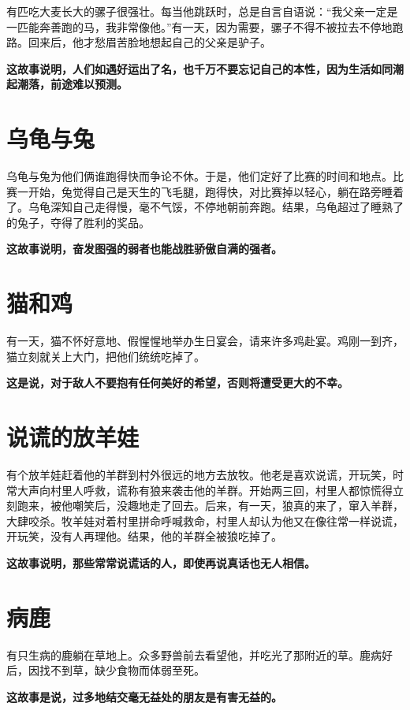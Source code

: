 有匹吃大麦长大的骡子很强壮。每当他跳跃时，总是自言自语说：“我父亲一定是一匹能奔善跑的马，我非常像他。”有一天，因为需要，骡子不得不被拉去不停地跑路。回来后，他才愁眉苦脸地想起自己的父亲是驴子。

{\bfseries \color{red}这故事说明，人们如遇好运出了名，也千万不要忘记自己的本性，因为生活如同潮起潮落，前途难以预测。}

\section{乌龟与兔}

乌龟与兔为他们俩谁跑得快而争论不休。于是，他们定好了比赛的时间和地点。比赛一开始，兔觉得自己是天生的飞毛腿，跑得快，对比赛掉以轻心，躺在路旁睡着了。乌龟深知自己走得慢，毫不气馁，不停地朝前奔跑。结果，乌龟超过了睡熟了的兔子，夺得了胜利的奖品。

{\bfseries \color{red}这故事说明，奋发图强的弱者也能战胜骄傲自满的强者。}

\section{猫和鸡}

有一天，猫不怀好意地、假惺惺地举办生日宴会，请来许多鸡赴宴。鸡刚一到齐，猫立刻就关上大门，把他们统统吃掉了。

{\bfseries \color{red}这是说，对于敌人不要抱有任何美好的希望，否则将遭受更大的不幸。}

\section{说谎的放羊娃}

有个放羊娃赶着他的羊群到村外很远的地方去放牧。他老是喜欢说谎，开玩笑，时常大声向村里人呼救，谎称有狼来袭击他的羊群。开始两三回，村里人都惊慌得立刻跑来，被他嘲笑后，没趣地走了回去。后来，有一天，狼真的来了，窜入羊群，大肆咬杀。牧羊娃对着村里拼命呼喊救命，村里人却认为他又在像往常一样说谎，开玩笑，没有人再理他。结果，他的羊群全被狼吃掉了。

{\bfseries \color{red}这故事说明，那些常常说谎话的人，即使再说真话也无人相信。}

\section{病鹿}

有只生病的鹿躺在草地上。众多野兽前去看望他，并吃光了那附近的草。鹿病好后，因找不到草，缺少食物而体弱至死。

{\bfseries \color{red}这故事是说，过多地结交毫无益处的朋友是有害无益的。}

